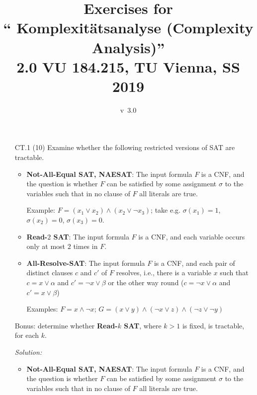 \documentclass[11pt,a4paper]{article}
\title{\vspace*{-2\baselineskip}Exercises for \\[0.2cm] 
`` Komplexit\"atsanalyse (Complexity Analysis)''\\[0.2cm]
2.0 VU 184.215, TU Vienna, SS 2019}
\date{v~3.0}
\begin{document}

\begin{enumerate}
\item[CT.1]  (10) Examine whether the following restricted versions of SAT  are tractable.
  
  \begin{itemize}

  \item {\bf Not-All-Equal SAT, NAESAT}: The input formula $F$ is a
        CNF, and the question is whether $F$ can be satisfied 
        by some assignment $\sigma$ to the variables such that in no clause of $F$ 
        all literals are true.
        
        Example: $F = (x_1 \lor x_2 ) \land (x_2 \lor \neg x_3)$; take e.g. $\sigma(x_1)=1$, $\sigma(x_2)=0$, $\sigma(x_3)=0$.  \\
        
        
\item  {\bf Read-$2$ SAT}: The input formula $F$ is a CNF, and each
        variable occurs only at most $2$ times in $F$.
        

 \item {\bf All-Resolve-SAT}:  The input formula $F$ is a  CNF, and
 each pair of distinct clauses $c$ and $c'$ of $F$ resolves, i.e.,
 there is a variable $x$ such that $c = x \lor \alpha$ and $c' = \neg
 x\lor   \beta$ or the other way round ($c = \neg x \lor \alpha$ and
 $c' = x\lor \beta$)

 Examples:  $F=x\land \neg x$;  $G = (x \lor y) \land (\neg x \lor z)
 \land (\neg z \lor \neg y)$

\end{itemize}

Bonus: determine whether {\bf Read-$k$ SAT}, where $k>1$ is fixed, is
tractable, for each $k$.

\bigskip

\emph{Solution:}

  \begin{itemize}

  \item {\bf Not-All-Equal SAT, NAESAT}: The input formula $F$ is a
        CNF, and the question is whether $F$ can be satisfied 
        by some assignment $\sigma$ to the variables such that in no clause of $F$ 
        all literals are true.
        

\end{itemize}
\end{enumerate}
\end{document}
